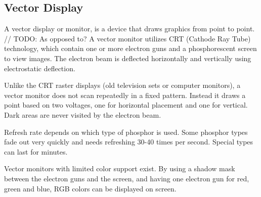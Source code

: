 \subsection{Vector Display}
A vector display or monitor, is a device that draws graphics from point to point.
// TODO: As opposed to?
A vector monitor utilizes CRT (Cathode Ray Tube) technology, which contain one or more electron guns and a phosphorescent screen to view images.
The electron beam is deflected horizontally and vertically using electrostatic deflection. \cite{vector-monitor}

Unlike the CRT raster displays (old television sets or computer monitors), a vector monitor does not scan repeatedly in a fixed pattern.
Instead it draws a point based on two voltages, one for horizontal placement and one for vertical. Dark areas are never visited by the electron beam.

Refresh rate depends on which type of phosphor is used. Some phosphor types fade out very quickly and needs refreshing 30-40 times per second. 
Special types can last for minutes.

Vector monitors with limited color support exist. 
By using a shadow mask between the electron guns and the screen, and having one electron gun for red, green and blue, RGB colors can be displayed on screen.

